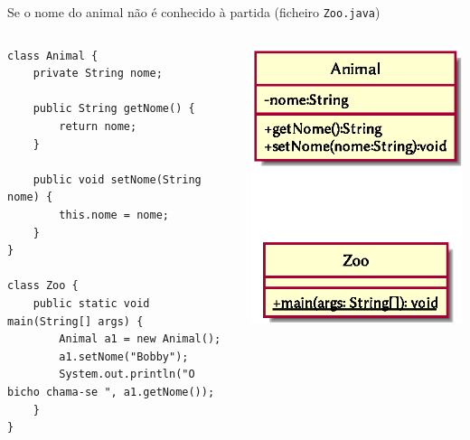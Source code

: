 \documentclass[portuguese, aspectratio=169, xcolor=table]{beamer}
\begin{document}
\begin{frame}[fragile]{Se o nome do animal não é conhecido à partida (ficheiro \texttt{Zoo.java})}
\begin{columns}
\begin{verbatim}
class Animal {
    private String nome;

    public String getNome() {
        return nome;
    }

    public void setNome(String nome) {
        this.nome = nome;
    }
}

class Zoo {
    public static void main(String[] args) {
        Animal a1 = new Animal();
        a1.setNome("Bobby");
        System.out.println("O bicho chama-se ", a1.getNome());
    }
}
\end{verbatim}
\begin{center}
\includegraphics[width=0.45\linewidth]{./uml_diagrams/class5}
\end{center}

\end{columns}
\end{frame}
\end{document}
